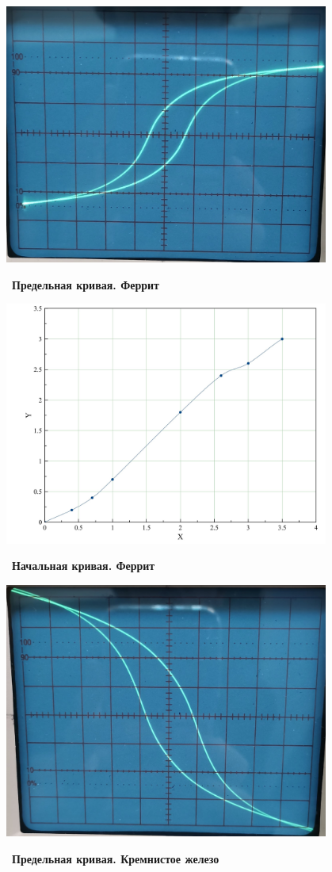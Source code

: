 \documentclass[a4paper,12pt]{article}
\begin{document}
\begin{center}
	\includegraphics[width = 0.8\textwidth]{2.jpg}
\end{center}\
\textbf{Предельная кривая. Феррит}

\begin{center}
	\includegraphics[width = 0.8\textwidth]{3_rev.jpg}
\end{center}\
\textbf{Начальная кривая. Феррит}

\newpage

\begin{center}
	\includegraphics[width = 0.8\textwidth]{3.jpg}
\end{center}\
\textbf{Предельная кривая. Кремнистое железо}
\end{document}

